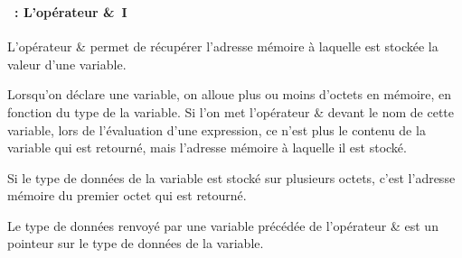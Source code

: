 \begin{frame}%
  \frametitle{\secname}
  \framesubtitle{\subsecname~: L'opérateur \&~I}
  
  L'opérateur \& permet de récupérer l'adresse mémoire à laquelle est stockée la valeur d'une variable.
  \vspace{0.5cm}
  \par
  Lorsqu'on déclare une variable, on alloue plus ou moins d'octets en mémoire, en fonction du type de la variable. 
  Si l'on met l'opérateur \& devant le nom de cette variable, lors de l'évaluation d'une expression, ce n'est plus le contenu de la 
  variable qui est retourné, mais l'adresse mémoire à laquelle il est stocké.
  \vspace{0.5cm}
  \par
  Si le type de données de la variable est stocké sur plusieurs octets, c'est l'adresse mémoire du premier octet qui est retourné.
  \vspace{0.5cm}
  \par
  Le type de données renvoyé par une variable précédée de l'opérateur \& est un pointeur sur le type de données de la variable.
\end{frame}

